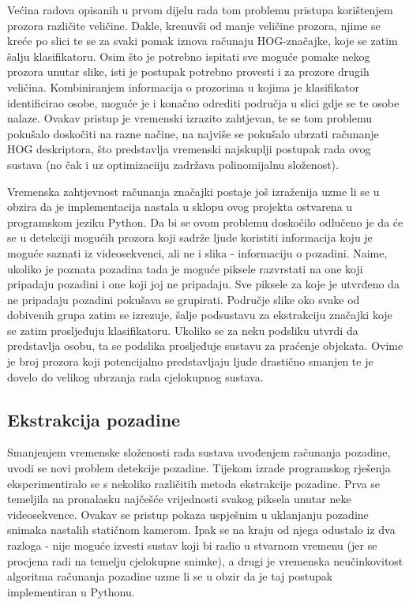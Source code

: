 \documentclass[times, utf8, seminar, numeric]{fer}
\begin{document}
Većina radova opisanih u prvom dijelu rada tom problemu pristupa korištenjem prozora različite veličine. Dakle, krenuvši od manje veličine prozora, njime se kreće po slici te se za svaki pomak iznova računaju HOG-značajke, koje se zatim šalju klasifikatoru. Osim što je potrebno ispitati sve moguće pomake nekog prozora unutar slike, isti je postupak potrebno provesti i za prozore drugih veličina. Kombiniranjem informacija o prozorima u kojima je klasifikator identificirao osobe, moguće je i konačno odrediti područja u slici gdje se te osobe nalaze. Ovakav pristup je vremenski izrazito zahtjevan, te se tom problemu pokušalo doskočiti na razne načine, na najviše se pokušalo ubrzati računanje HOG deskriptora, što predstavlja vremenski najskuplji postupak rada ovog sustava (no čak i uz optimizaciiju zadržava polinomijalnu složenost).

Vremenska zahtjevnost računanja značajki postaje još izraženija uzme  li se u obzira da je implementacija nastala u sklopu ovog projekta ostvarena u programskom jeziku Python. Da bi se ovom problemu doskočilo odlučeno je da će se u detekciji mogućih prozora koji sadrže ljude koristiti informacija koju je moguće saznati iz videosekvenci, ali ne i slika - informaciju o pozadini. Naime, ukoliko je poznata pozadina tada je moguće piksele razvrstati na one koji pripadaju pozadini i one koji joj ne pripadaju. Sve piksele za koje je utvrđeno da ne pripadaju pozadini pokušava se grupirati. Područje slike oko svake od dobivenih grupa zatim se izrezuje, šalje podsustavu za ekstrakciju značajki koje se zatim prosljeđuju klasifikatoru. Ukoliko se za neku podsliku utvrdi da predstavlja osobu, ta se podslika prosljeđuje sustavu za praćenje objekata. Ovime je broj prozora koji potencijalno predstavljaju ljude drastično smanjen te je dovelo do velikog ubrzanja rada cjelokupnog sustava.

\subsection{Ekstrakcija pozadine}
Smanjenjem vremenske složenosti rada sustava uvođenjem računanja pozadine, uvodi se novi problem detekcije pozadine. Tijekom izrade programskog rješenja eksperimentiralo se s nekoliko različitih metoda ekstrakcije pozadine. Prva se temeljila na pronalasku najčešće vrijednosti svakog piksela unutar neke videosekvence. Ovakav se pristup pokaza uspješnim u uklanjanju pozadine snimaka nastalih statičnom kamerom. Ipak se na kraju od njega odustalo iz dva razloga - nije moguće izvesti sustav koji bi radio u stvarnom vremenu (jer se procjena radi na temelju cjelokupne snimke), a drugi je vremenska neučinkovitost algoritma računanja pozadine uzme li se u obzir da je taj postupak implementiran u Pythonu.
\end{document}
